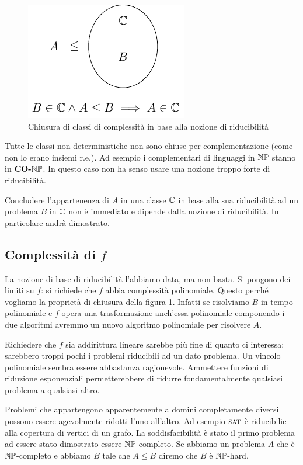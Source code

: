 \begin{figure}[h]
    \begin{center}
        \includegraphics{./img/complexity_intro/ReducibilityNotion.pdf}
    \end{center}
    \caption{Chiusura di classi di complessità in base alla nozione di riducibilità}
    \label{ReducibilityNotion}
\end{figure}

Tutte le classi non deterministiche non sono chiuse per complementazione (come non lo erano insiemi
r.e.). Ad esempio i complementari di linguaggi in $\mathbb{NP}$ stanno in $\textbf{CO-}\mathbb{NP}$. In questo caso
non ha senso usare una nozione troppo forte di riducibilità.

Concludere l'appartenenza di $A$ in una classe $\mathbb{C}$ in base alla sua riducibilità ad un
problema $B$ in $\mathbb{C}$ non è immediato e dipende dalla nozione di riducibilità. In particolare
andrà dimostrato.

\subsection{Complessità di $f$}

La nozione di base di riducibilità l'abbiamo data, ma non basta. Si pongono dei limiti su $f$: si
richiede che $f$ abbia complessità polinomiale. Questo perché vogliamo la proprietà di chiusura
della figura \ref{ReducibilityNotion}. Infatti se risolviamo $B$ in tempo polinomiale e $f$ opera
una trasformazione anch'essa polinomiale componendo i due algoritmi avremmo un nuovo algoritmo
polinomiale per risolvere $A$.

Richiedere che $f$ sia addirittura lineare sarebbe più fine di quanto ci interessa: sarebbero troppi
pochi i problemi riducibili ad un dato problema. Un vincolo polinomiale sembra essere abbastanza
ragionevole.  Ammettere funzioni di riduzione esponenziali permetterebbere di ridurre
fondamentalmente qualsiasi problema a qualsiasi altro.

Problemi che appartengono apparentemente a domini completamente diversi possono essere agevolmente
ridotti l'uno all'altro. Ad esempio $\textsc{sat}$ è riducibilie alla copertura di vertici di un grafo. La
soddisfacibilità è stato il primo problema ad essere stato dimostrato essere $\mathbb{NP}$-completo. Se
abbiamo un problema $A$ che è $\mathbb{NP}$-completo e abbiamo $B$ tale che $A \leq B$ diremo che $B$
è $\mathbb{NP}$-hard.

